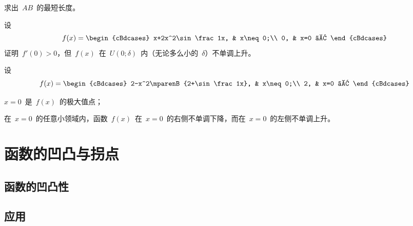\begin{exercise}
\begin{exlist}
  \item 求出~$AB$~的最短长度。
\end{exlist}
\item 设
\[
  f(x)=\begin{cBdcases}
    x+2x^2\sin\frac1x, & x\neq0;\\
    0, & x=0 。
  \end{cBdcases}
\]
证明~$f'(0)>0$，但~$f(x)$~在~$U(0;\delta)$~内（无论多么小的~$\delta$）不单调上升。
\item 设
\[
  f(x)=\begin{cBdcases}
    2-x^2\mparenB{2+\sin\frac1x}, & x\neq0;\\
    2, & x=0 。
  \end{cBdcases}
\]
\begin{exlist}\FixExHead
  \item $x=0$~是~$f(x)$~的极大值点；
  \item 在~$x=0$~的任意小领域内，函数~$f(x)$~在~$x=0$~的右侧不单调下降，而在~$x=0$~的左侧不单调上升。
\end{exlist}
\end{exercise}

\section{函数的凹凸与拐点}
\subsection{函数的凹凸性}
\subsection{应用}
